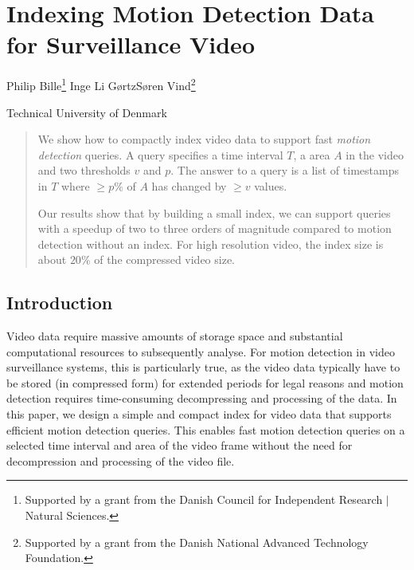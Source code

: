 \chapter{Indexing Motion Detection Data for Surveillance Video}\label{chp:motiondetection}
\begin{infosection}
    \begin{authors}
        Philip Bille\footnote{Supported by a grant from the Danish Council for Independent Research $\vert$ Natural Sciences.} \qquad Inge Li G{\o}rtz\samethanks \qquad S{\o}ren Vind\footnote{Supported by a grant from the Danish National Advanced Technology Foundation.}
    \end{authors}

    \begin{uninames}
        Technical University of Denmark
    \end{uninames}


    \begin{abstract}
        We show how to compactly index video data to support fast \emph{motion detection} queries. 
        A query specifies a time interval $T$, a area $A$ in the video and two thresholds $v$ and $p$. The answer to a query is a list of timestamps in $T$ where $\geq p\%$ of $A$ has changed by $\geq v$ values.
    
        Our results show that by building a small index, we can support queries with a speedup of two to three orders of magnitude compared to motion detection without an index. For high resolution video, the index size is about $20\%$ of the compressed video size.
    \end{abstract}
\end{infosection}


\section{Introduction}
Video data require massive amounts of storage space and substantial computational resources to subsequently analyse. For motion detection in video surveillance systems, this is particularly true, as the video data typically have to be stored (in compressed form) for extended periods for legal reasons and motion detection requires time-consuming decompressing and processing of the data. In this paper, we design a simple and compact index for video data that supports efficient motion detection queries. This enables fast motion detection queries on a selected time interval and area of the video frame without the need for decompression and processing of the video file. 

